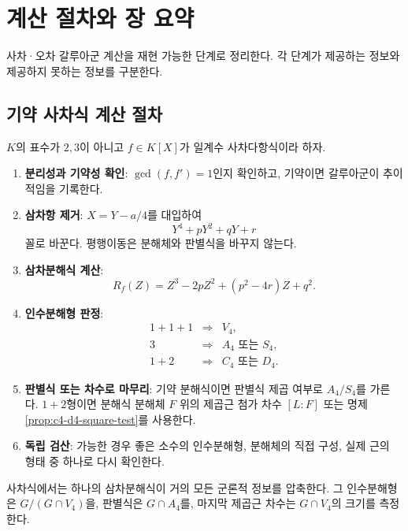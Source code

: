 \clearpage
\section{계산 절차와 장 요약}
\label{sec:quartic-quintic-workflow}

\begin{learninggoal}
사차·오차 갈루아군 계산을 재현 가능한 단계로 정리한다. 각 단계가 제공하는 정보와 제공하지 못하는 정보를 구분한다.
\end{learninggoal}

\subsection{기약 사차식 계산 절차}

$K$의 표수가 $2,3$이 아니고 $f\in K[X]$가 일계수 사차다항식이라 하자.

\begin{enumerate}
  \item \textbf{분리성과 기약성 확인}: $\gcd(f,f')=1$인지 확인하고, 기약이면 갈루아군이 추이적임을 기록한다.
  \item \textbf{삼차항 제거}: $X=Y-a/4$를 대입하여
  \[
    Y^4+pY^2+qY+r
  \]
  꼴로 바꾼다. 평행이동은 분해체와 판별식을 바꾸지 않는다.
  \item \textbf{삼차분해식 계산}:
  \[
    R_f(Z)=Z^3-2pZ^2+(p^2-4r)Z+q^2.
  \]
  \item \textbf{인수분해형 판정}:
  \[
  \begin{array}{ccl}
    1+1+1&\Rightarrow&V_4,\\
    3&\Rightarrow&A_4\text{ 또는 }S_4,\\
    1+2&\Rightarrow&C_4\text{ 또는 }D_4.
  \end{array}
  \]
  \item \textbf{판별식 또는 차수로 마무리}: 기약 분해식이면 판별식 제곱 여부로 $A_4/S_4$를 가른다. $1+2$형이면 분해식 분해체 $F$ 위의 제곱근 첨가 차수 $[L:F]$ 또는 명제 \ref{prop:c4-d4-square-test}를 사용한다.
  \item \textbf{독립 검산}: 가능한 경우 좋은 소수의 인수분해형, 분해체의 직접 구성, 실제 근의 형태 중 하나로 다시 확인한다.
\end{enumerate}

\begin{keyidea}
사차식에서는 하나의 삼차분해식이 거의 모든 군론적 정보를 압축한다. 그 인수분해형은 $G/(G\cap V_4)$을, 판별식은 $G\cap A_4$를, 마지막 제곱근 차수는 $G\cap V_4$의 크기를 측정한다.
\end{keyidea}

